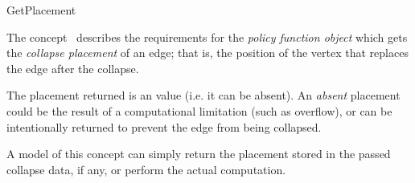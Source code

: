 
\begin{ccRefConcept}{GetPlacement}


\ccDefinition

The concept \ccRefName\ describes the requirements for the {\em policy function object} which gets the {\em collapse placement} of an edge; that is, the position of the vertex that replaces the edge after the collapse.

The placement returned is an  value (i.e. it can be absent). An {\em absent} placement could be the result of a computational limitation (such as overflow), or can be intentionally returned to prevent the edge from being collapsed.

A model of this concept can simply return the placement stored in the passed collapse data, if any, or perform the actual computation.

\ccRefines
{}

\ccTypes
\ccGlue    
\ccGlue    
\ccGlue    
\ccGlue    

\ccCreation
{}  %


\end{ccRefConcept}
